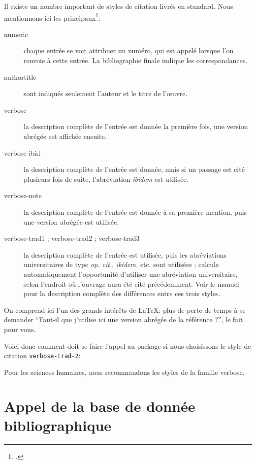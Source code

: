 Il existe un nombre important de styles de citation livrés en standard. Nous mentionnons ici les principaux\footcite[Se reporter pour plus de détails à][]{biblatex_style}:
\begin{description}
\item[numeric] chaque entrée se voit attribuer un numéro, qui est appelé lorsque l'on renvoie à cette entrée. La bibliographie finale indique les correspondances.
\item[authortitle] sont indiqués seulement l'auteur et le titre de l'œuvre.
\item[verbose] la description complète de l'entrée est donnée la première fois, une version abrégée est affichée ensuite.
\item[verbose-ibid] la description complète de l'entrée est donnée, mais si un passage est cité plusieurs fois de suite, l'abréviation \emph{ibidem} est utilisée.
\item[verbose-note] la description complète de l'entrée est donnée à sa première mention, puis une version abrégée est utilisée.
\item[verbose-trad1 ; verbose-trad2 ; verbose-trad3] la description complète de l'entrée est utilisée, puis les abréviations universitaires de type \emph{op. cit.}, \emph{ibidem.} etc. sont utilisées ;  calcule automatiquement l'opportunité d'utiliser une abréviation universitaire, selon l'endroit où l'ouvrage aura été cité précédemment. Voir le manuel pour la description complète des différences entre ces trois styles.
\end{description}

On comprend ici l'un des grands intérêts de \LaTeX : plus de perte de temps à se demander \enquote{Faut-il que j'utilise ici une version abrégée de la référence ?},  le fait pour vous.

Voici donc comment doit se faire l'appel au package si nous choisissons le style de citation \verb|verbose-trad-2|:

\begin{latexcode}
\usepackage[citestyle=verbose-trad2]{biblatex}
\end{latexcode}

Pour les sciences humaines, nous recommandons les styles de la famille verbose.


\section{Appel de la base de donnée bibliographique}


